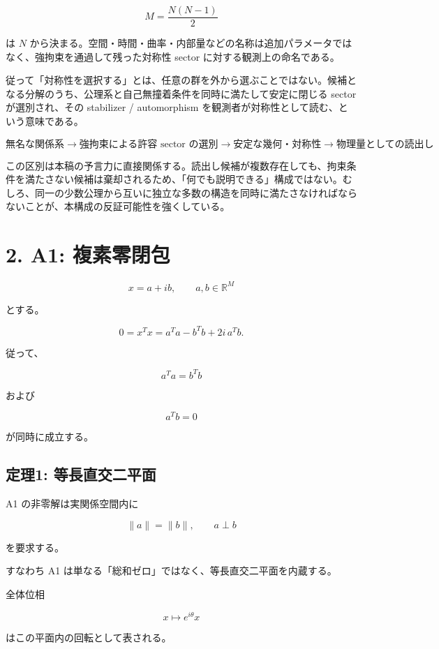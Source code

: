 \documentclass[
  a4paper,
]{ltjsarticle}
\begin{document}
\[
M=\frac{N(N-1)}2
\]

は \(N\)
から決まる。空間・時間・曲率・内部量などの名称は追加パラメータではなく、強拘束を通過して残った対称性
sector に対する観測上の命名である。

従って「対称性を選択する」とは、任意の群を外から選ぶことではない。候補となる分解のうち、公理系と自己無撞着条件を同時に満たして安定に閉じる
sector が選別され、その stabilizer / automorphism
を観測者が対称性として読む、という意味である。

\[
\boxed{
\text{無名な関係系}
\longrightarrow
\text{強拘束による許容 sector の選別}
\longrightarrow
\text{安定な幾何・対称性}
\longrightarrow
\text{物理量としての読出し}
}
\]

この区別は本稿の予言力に直接関係する。読出し候補が複数存在しても、拘束条件を満たさない候補は棄却されるため、「何でも説明できる」構成ではない。むしろ、同一の少数公理から互いに独立な多数の構造を同時に満たさなければならないことが、本構成の反証可能性を強くしている。

\section{2. A1: 複素零閉包}\label{a1-ux8907ux7d20ux96f6ux9589ux5305}

\[
x=a+ib,
\qquad a,b\in\mathbb R^M
\]

とする。

\[
0=x^Tx
=
a^Ta-b^Tb+2i\,a^Tb.
\]

従って、

\[
\boxed{
a^Ta=b^Tb
}
\]

および

\[
\boxed{
a^Tb=0
}
\]

が同時に成立する。

\subsection{定理1:
等長直交二平面}\label{ux5b9aux74061-ux7b49ux9577ux76f4ux4ea4ux4e8cux5e73ux9762}

A1 の非零解は実関係空間内に

\[
\boxed{
\|a\|=\|b\|,
\qquad
a\perp b
}
\]

を要求する。

すなわち A1 は単なる「総和ゼロ」ではなく、等長直交二平面を内蔵する。

全体位相

\[
x\mapsto e^{i\theta}x
\]

はこの平面内の回転として表される。
\end{document}
